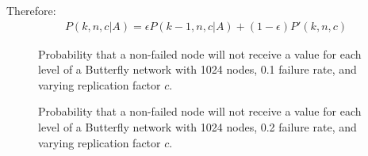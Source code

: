 \documentclass[10pt]{style}
\theoremstyle{plain}
\theoremstyle{definition}
\theoremstyle{remark}
\numberwithin{equation}{section}
\begin{document}
  \noindent Therefore:
  \begin{eqnarray*}
    P(k,n,c|A) = \epsilon P(k-1,n,c|A) + (1-\epsilon)P'(k,n,c)
  \end{eqnarray*}
   
  \begin{figure}
    \begin{center}
      \caption{\footnotesize Probability that a non-failed node will
      not receive a value for each level of a Butterfly network with
      1024 nodes, 0.1 failure rate, and varying replication factor $c$.}
      \label{test}
    \end{center}
  \end{figure}

  \begin{figure}
    \begin{center}
      \caption{\footnotesize Probability that a non-failed node will
      not receive a value for each level of a Butterfly network with
      1024 nodes, 0.2 failure rate, and varying replication factor $c$.}
      \label{test}
    \end{center}
  \end{figure}

  
  
\end{document}
